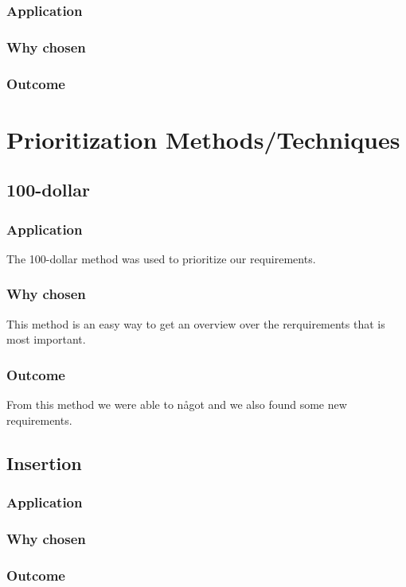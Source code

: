 \documentclass[a4paper]{article}
\begin{document}
	    \subsubsection{Application}
    	\subsubsection{Why chosen}
    	\subsubsection{Outcome}


	\section{Prioritization Methods/Techniques}

  \subsection{100-dollar}
    \subsubsection{Application}
      The 100-dollar method was used to prioritize our requirements. 
    \subsubsection{Why chosen}
      This method is an easy way to get an overview over the rerquirements that is most important.
    \subsubsection{Outcome}
      From this method we were able to något and we also found some new requirements.

  \subsection{Insertion}
    \subsubsection{Application}
    \subsubsection{Why chosen}
    \subsubsection{Outcome}
    
\end{document}

